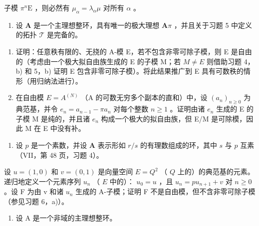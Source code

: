 子模 \(\pi^n\mathrm{E}\) ，则必然有 \(\mu_{\alpha} = \lambda_{\alpha}\mu\) 对所有 \(\alpha\) 。

\begin{enumerate}
\def\labelenumi{\arabic{enumi})}
\setcounter{enumi}{5}
\tightlist
\item
  设 \(\mathbf{A}\) 是一个主理想整环，具有唯一的极大理想 \(\mathbf{A}\pi\) ，并且关于习题 5 中定义的拓扑 \(\mathcal{T}\) 是完备的。
\end{enumerate}

\begin{enumerate}
\def\labelenumi{\alph{enumi})}
\item
  证明：任意秩有限的、无挠的 A-模 E，若不包含非零可除子模，则 E 是自由的（考虑由一个极大拟自由族生成的 E 的子模 M；若 \(M \neq E\) 则借助习题 4，b) 和 5，b) 证明 E 包含非零可除子模）。将此结果推广到 E 具有可数秩的情形（用归纳法进行）。
\item
  在自由模 \(E = A^{(N)}\) （A 的可数无穷多个副本的直和）中，设 \((a_{n})_{n \geq 0}\) 为典范基，并令 \(e_{n} = a_{n-1} - \pi a_{n}\) 对每个整数 \(n \geq 1\) 。证明由诸 \(e_{n}\) 生成的 E 的子模 M 是纯的，并且诸 \(e_{n}\) 构成一个极大的拟自由族，但 E/M 是可除模，因此 M 在 E 中没有补。
\end{enumerate}

\begin{enumerate}
\def\labelenumi{\arabic{enumi})}
\setcounter{enumi}{6}
\tightlist
\item
  设 \(p\) 是一个素数，并设 \(\mathbf{A}\) 表示形如 \(r / s\) 的有理数组成的环，其中 \(s\) 与 \(p\) 互素（VII，第 48 页，习题 4）。
\end{enumerate}

设 \(u = (1,0)\) 和 \(v = (0,1)\) 是向量空间 \(E = Q^2\) （ \(Q\) 上的）的典范基的元素。递归地定义一个元素序列 \(u_n\) （ \(E\) 中的）： \(u_0 = u\) ，且 \(u_{n}=pu_{n+1}+v\) 对 \(n\geqslant0\) 。设 F 为由 v 和诸 \(u_{n}\) 生成的 A-子模；证明 F 不是自由模，但不含非零可除子模（参见习题 6，a)）。

\begin{enumerate}
\def\labelenumi{\arabic{enumi})}
\setcounter{enumi}{7}
\tightlist
\item
  设 A 是一个非域的主理想整环。
\end{enumerate}


